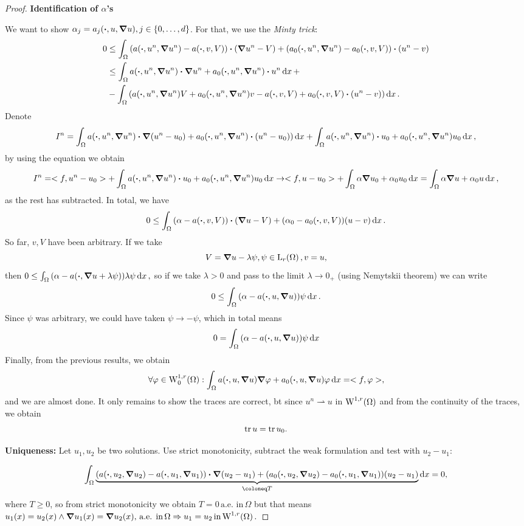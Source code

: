 \documentclass{article}
\begin{document}
\begin{proof}
	\textbf{Identification of $\alpha$'s}


	We want to show $\alpha_j = a_j\qty(\vdot, u, \grad u), j \in \{0, \dots, d\}$. For that, we use the \textit{Minty trick}:
	\begin{align*}
		0 &\leq \int_{\Omega }\qty(a\qty(\vdot, u^n, \grad u^n) - a\qty(\vdot,v,V))\vdot\qty(\grad u^n - V) + \qty(a_0\qty(\vdot,u^n,\grad u^n)-a_0\qty(\vdot,v,V))\vdot \qty(u^n -v) \\
		  &\leq \int_{\Omega}a\qty(\vdot, u^n, \grad u^n)\vdot \grad u^n + a_0\qty(\vdot, u^n, \grad u^n)\vdot u^n \dd{x} + \\
		  &- \int_{\Omega}\qty(a\qty(\vdot, u^n, \grad u^n)V + a_0\qty(\vdot, u^n, \grad u^n)v-a\qty(\vdot,v,V)+a_0\qty(\vdot,v,V)\vdot\qty(u^n-v))\dd{x}.
	\end{align*}
	Denote
	\[
		I^n = \int_{\Omega}a\qty(\vdot, u^n, \grad u^n) \vdot \grad \qty(u^n-u_0)+ a_0\qty(\vdot, u^n, \grad u^n)\vdot \qty(u^n - u_0))\dd{x} + \int_{\Omega}a\qty(\vdot, u^n, \grad u^n)\vdot u_0 + a_0(\vdot, u^n, \grad u^n)u_0\dd{x},
	\]
	by using the equation we obtain
	\[
		I^n = <f, u^n - u_0> + \int_{\Omega}a\qty(\vdot, u^n, \grad u^n)\vdot u_0 + a_0(\vdot, u^n, \grad u^n)u_0\dd{x} \to <f,u-u_0> + \int_{\Omega}\alpha \grad u_0 + \alpha_0 u_0\dd{x} = \int_{\Omega}\alpha \grad u + \alpha_0 u\dd{x},
	\]
	as the rest has subtracted. In total, we have
	\[
		0 \leq \int_{\Omega}\qty(\alpha - a\qty(\vdot, v, V))\vdot \qty(\grad u - V)+\qty(\alpha_0 - a_0\qty(\vdot, v, V))(u-v)\dd{x}.
	\]
	So far, $v,V$ have been arbitrary. If we take
	\[
		V = \grad u - \lambda \psi, \psi \in \LpSet[r]{\Omega}, v = u,
	\]
	then $ 0 \leq \int_{\Omega}\qty(\alpha - a\qty(\vdot, \grad u + \lambda \psi))\lambda \psi\dd{x}, $ so if we take $\lambda >0$ and pass to the limit $\lambda \to 0_+$ (using Nemytskii theorem) we can write
	\[
		0 \leq \int_{\Omega}\qty(\alpha - a\qty(\vdot, u, \grad u))\psi\dd{x}.
	\]
	Since $\psi$ was arbitrary, we could have taken $\psi \to - \psi$, which in total means
	\[
		0 = \int_{\Omega}\qty(\alpha - a\qty(\vdot, u, \grad u))\psi \dd{x}
	\]
	Finally, from the previous results, we obtain
	\[
		\forall \varphi \in \WkpzeroSet[1][r]{\Omega}: \int_{\Omega}a\qty(\vdot, u, \grad u)\grad \varphi+a_0\qty(\vdot, u, \grad u)\varphi\dd{x} = <f,\varphi>,
	\]
	and we are almost done. It only remains to show the traces are correct, bt since $u^n \rightharpoonup u$ in $\WkpSet[1][r]{\Omega}$ and from the continuity of the traces, we obtain
	\[
		\tr u = \tr u_0.
	\]

	\textbf{Uniqueness:} Let $u_1, u_2$ be two solutions. Use strict monotonicity, subtract the weak formulation and test with $u_2-u_1$:
	

	\[
		\int_{\Omega}\underbrace{\qty(a\qty(\vdot, u_2, \grad u_2)-a\qty(\vdot, u_1, \grad u_1))\vdot \grad\qty(u_2 - u_1)+\qty(a_0\qty(\vdot, u_2, \grad u_2)-a_0\qty(\vdot, u_1, \grad u_1))\qty(u_2-u_1)}_{\coloneq T}\dd{x} =0,
	\]
	where $T \geq 0$, so from strict monotonicity we obtain $T =0 \, \text{a.e. in} \, \Omega$ but that means $u_1(x) = u_2(x) \wedge \grad u_1(x) = \grad u_2 (x), \, \text{a.e. in} \, \Omega \Rightarrow u_1 = u_2 \, \text{in} \, \WkpSet[1][r]{\Omega}.$
\end{proof}
\end{document}
